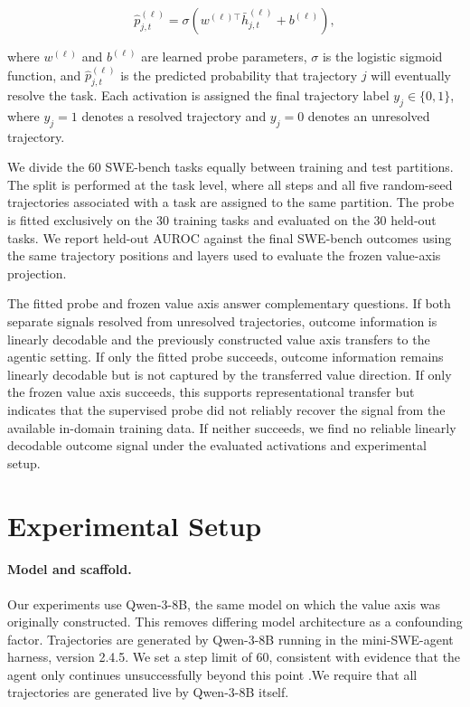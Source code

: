 \begin{equation}
\hat{p}_{j,t}^{(\ell)} = \sigma\!\left(w^{(\ell)\top}\bar{h}_{j,t}^{(\ell)} + b^{(\ell)}\right),
\end{equation}

where $w^{(\ell)}$ and $b^{(\ell)}$ are learned probe parameters, $\sigma$ is the logistic sigmoid function, and $\hat{p}_{j,t}^{(\ell)}$ is the predicted probability that trajectory $j$ will eventually resolve the task. Each activation is assigned the final trajectory label $y_j \in \{0,1\}$, where $y_j=1$ denotes a resolved trajectory and $y_j=0$ denotes an unresolved trajectory.

We divide the 60 SWE-bench tasks equally between training and test partitions. The split is performed at the task level, where all steps and all five random-seed trajectories associated with a task are assigned to the same partition. The probe is fitted exclusively on the 30 training tasks and evaluated on the 30 held-out tasks. We report held-out AUROC against the final SWE-bench outcomes using the same trajectory positions and layers used to evaluate the frozen value-axis projection.


The fitted probe and frozen value axis answer complementary questions. If both separate signals resolved from unresolved trajectories, outcome information is linearly decodable and the previously constructed value axis transfers to the agentic setting. If only the fitted probe succeeds, outcome information remains linearly decodable but is not captured by the transferred value direction. If only the frozen value axis succeeds, this supports representational transfer but indicates that the supervised probe did not reliably recover the signal from the available in-domain training data. If neither succeeds, we find no reliable linearly decodable outcome signal under the evaluated activations and experimental setup.

\section{Experimental Setup}

\paragraph{Model and scaffold.} Our experiments use Qwen-3-8B, the same model on which the value axis was originally constructed. This removes differing model architecture as a confounding factor. Trajectories are generated by Qwen-3-8B running in the mini-SWE-agent harness, version 2.4.5. We set a step limit of 60, consistent with evidence that the agent only continues unsuccessfully beyond this point \citep{agentstop2026}.We require that all trajectories are generated live by Qwen-3-8B itself.


